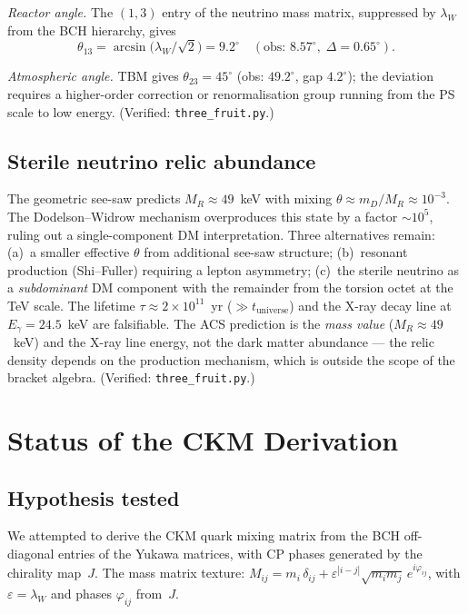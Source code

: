 \documentclass[11pt,a4paper]{article}
\theoremstyle{plain}
\theoremstyle{definition}
\theoremstyle{remark}
\begin{document}
\textit{Reactor angle.}
The $(1,3)$ entry of the neutrino mass matrix, suppressed by
$\lambda_W$ from the BCH hierarchy, gives
\[
  \theta_{13} = \arcsin\!\bigl(\lambda_W/\!\sqrt{2}\bigr) = 9.2^\circ
  \quad(\text{obs: } 8.57^\circ,\; \Delta = 0.65^\circ).
\]

\textit{Atmospheric angle.}
TBM gives $\theta_{23} = 45^\circ$ (obs: $49.2^\circ$, gap $4.2^\circ$);
the deviation requires a higher-order correction or renormalisation
group running from the PS scale to low energy.
(Verified: \texttt{three\_fruit.py}.)

\subsection*{Sterile neutrino relic abundance}

The geometric see-saw predicts $M_R \approx 49$~keV with mixing
$\theta \approx m_D/M_R \approx 10^{-3}$.  The Dodelson--Widrow
mechanism overproduces this state by a factor $\sim\! 10^5$,
ruling out a single-component DM interpretation.  Three alternatives
remain: (a)~a smaller effective $\theta$ from additional see-saw
structure; (b)~resonant production (Shi--Fuller) requiring a lepton
asymmetry; (c)~the sterile neutrino as a \emph{subdominant} DM
component with the remainder from the torsion octet at the TeV scale.
The lifetime $\tau \approx 2 \times 10^{11}$~yr ($\gg t_{\mathrm{universe}}$)
and the X-ray decay line at $E_\gamma = 24.5$~keV are falsifiable.
The ACS prediction is the \emph{mass value} ($M_R \approx 49$~keV)
and the X-ray line energy, not the dark matter abundance ---
the relic density depends on the production mechanism, which is
outside the scope of the bracket algebra.
(Verified: \texttt{three\_fruit.py}.)

\clearpage
\section{Status of the CKM Derivation}
\label{app:ckm-status}

\subsection*{Hypothesis tested}

We attempted to derive the CKM quark mixing matrix from the BCH
off-diagonal entries of the Yukawa matrices, with CP phases
generated by the chirality map~$J$.  The mass matrix texture:
$M_{ij} = m_i\,\delta_{ij} + \varepsilon^{|i-j|}\sqrt{m_i m_j}\,e^{i\varphi_{ij}}$,
with $\varepsilon = \lambda_W$ and phases $\varphi_{ij}$ from~$J$.
\end{document}

